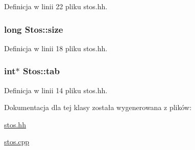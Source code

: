 Definicja w linii 22 pliku stos.\-hh.

\hypertarget{class_stos_a07ba18a24f8f0dbd9144406d15bcd342}{
\subsubsection[{size}]{\setlength{\rightskip}{0pt plus 5cm}long Stos\-::size\hspace{0.3cm}{\ttfamily [private]}}}\label{class_stos_a07ba18a24f8f0dbd9144406d15bcd342}


Definicja w linii 18 pliku stos.\-hh.

\hypertarget{class_stos_abcb666dd5a69fe50228595dc8ac4160a}{
\subsubsection[{tab}]{\setlength{\rightskip}{0pt plus 5cm}int$\ast$ Stos\-::tab\hspace{0.3cm}{\ttfamily [private]}}}\label{class_stos_abcb666dd5a69fe50228595dc8ac4160a}


Definicja w linii 14 pliku stos.\-hh.



Dokumentacja dla tej klasy została wygenerowana z plików\-:\begin{DoxyCompactItemize}
\item 
\hyperlink{stos_8hh}{stos.\-hh}\item 
\hyperlink{stos_8cpp}{stos.\-cpp}\end{DoxyCompactItemize}
